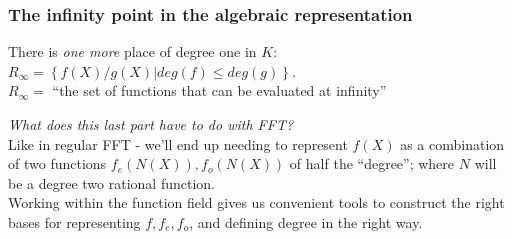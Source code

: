 \documentclass[shadesubsections,compress,14pt,mathserif]{beamer}
\newcommand{\set}[1]{\ensuremath{\left\{#1\right\}}}
\newcommand{\nl}{\\ \pause \vspace{0.2in}}
\newcommand{\nlnp}{\\ \vspace{0.2in}}
\begin{document}
\begin{frame}
 \frametitle{The infinity point in the algebraic representation}
 There is \emph{one more} place of degree one in $K$:
 $R_{\infty}=\set{f(X)/g(X)|deg(f)\leq deg(g)}$. \nl
 $R_{\infty}=$ ``the set of functions that can be evaluated at infinity''
 
\end{frame}
\begin{frame}
 \textit{What does this last part have to do with FFT?}\nlnp
Like in regular FFT - we'll end up needing to represent $f(X)$ as a combination of two functions $f_e(N(X)), f_o(N(X))$
of half the ``degree''; where $N$ will be a degree two rational function.\nl
Working within the function field gives us convenient tools to construct the right bases for representing $f,f_e,f_o$,
and defining degree in the right way.

 
\end{frame}
\end{document}
